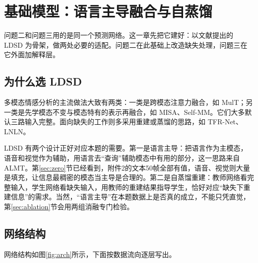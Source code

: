 \section{基础模型：语言主导融合与自蒸馏}\label{sec:base}

问题二和问题三用的是同一个预测网络。这一章先把它建好：以文献\cite{shi2026ldsd}提出的 LDSD 为骨架，做两处必要的适配。问题二在此基础上改造缺失处理，问题三在它外面加解释层。

\subsection{为什么选 LDSD}

多模态情感分析的主流做法大致有两类：一类是跨模态注意力融合，如 MulT\cite{tsai2019mult}；另一类是先学模态不变与模态特有的表示再融合，如 MISA\cite{hazarika2020misa}、Self-MM\cite{yu2021selfmm}。它们大多默认三路输入完整。面向缺失的工作则多采用重建或蒸馏的思路，如 TFR-Net\cite{yuan2021tfrnet}、LNLN\cite{zhang2024lnln}。

LDSD 有两个设计正好对应本题的需要。第一是语言主导：把语言作为主模态，语音和视觉作为辅助，用语言去“查询”辅助模态中有用的部分，这一思路来自 ALMT\cite{zhang2023almt}。第\ref{sec:zero}节已经看到，附件2的文本50帧全部有值，语音、视觉则大量是填充，让信息最稠密的模态当主导是合理的。第二是自蒸馏重建：教师网络看完整输入，学生网络看缺失输入，用教师的重建结果指导学生，恰好对应“缺失下重建信息”的需求。当然，“语言主导”在本题数据上是否真的成立，不能只凭直觉，第\ref{sec:ablation}节会用两组消融专门检验。

\subsection{网络结构}

网络结构如图\ref{fig:arch}所示，下面按数据流向逐层写出。

